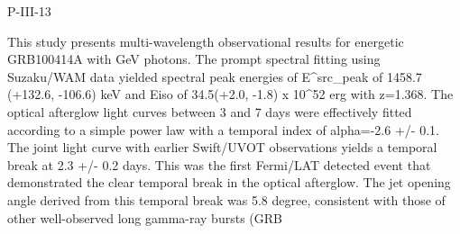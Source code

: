 P-III-13


\bigskip



\bigskip

\noindent This study presents multi-wavelength observational results for energetic
GRB100414A with GeV photons. The prompt spectral fitting using Suzaku/WAM data
yielded spectral peak energies of E^src_peak of 1458.7 (+132.6, -106.6) keV and
Eiso of 34.5(+2.0, -1.8) x 10^52 erg with z=1.368. The optical afterglow light
curves between 3 and 7 days were effectively fitted according to a simple power
law with a temporal index of alpha=-2.6 +/- 0.1. The joint light curve with
earlier Swift/UVOT observations yields a temporal break at 2.3 +/- 0.2 days.
This was the first Fermi/LAT detected event that demonstrated the clear
temporal break in the optical afterglow. The jet opening angle derived from
this temporal break was 5.8 degree, consistent with those of other
well-observed long gamma-ray bursts (GRB
